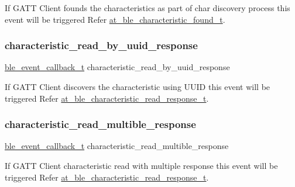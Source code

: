 If G\+A\+TT Client founds the characteristics as part of char discovery process this event will be triggered Refer \mbox{\hyperlink{structat__ble__characteristic__found__t}{at\+\_\+ble\+\_\+characteristic\+\_\+found\+\_\+t}}. 

\mbox{\label{structble__gatt__client__event__cb_aa0e76a1ad0f3e798ea31ff98ba213309}} 
\subsubsection{\texorpdfstring{characteristic\_read\_by\_uuid\_response}{characteristic\_read\_by\_uuid\_response}}
{\footnotesize\ttfamily \mbox{\hyperlink{ble__manager_8h_a04ce4bb8cb8282f2762e3924b1773cc9}{ble\+\_\+event\+\_\+callback\+\_\+t}} characteristic\+\_\+read\+\_\+by\+\_\+uuid\+\_\+response}



If G\+A\+TT Client discovers the characteristic using U\+U\+ID this event will be triggered Refer \mbox{\hyperlink{structat__ble__characteristic__read__response__t}{at\+\_\+ble\+\_\+characteristic\+\_\+read\+\_\+response\+\_\+t}}. 

\mbox{\label{structble__gatt__client__event__cb_add8b50999d393179e93d19c3bd15defd}} 
\subsubsection{\texorpdfstring{characteristic\_read\_multible\_response}{characteristic\_read\_multible\_response}}
{\footnotesize\ttfamily \mbox{\hyperlink{ble__manager_8h_a04ce4bb8cb8282f2762e3924b1773cc9}{ble\+\_\+event\+\_\+callback\+\_\+t}} characteristic\+\_\+read\+\_\+multible\+\_\+response}



If G\+A\+TT Client characteristic read with multiple response this event will be triggered Refer \mbox{\hyperlink{structat__ble__characteristic__read__response__t}{at\+\_\+ble\+\_\+characteristic\+\_\+read\+\_\+response\+\_\+t}}. 

